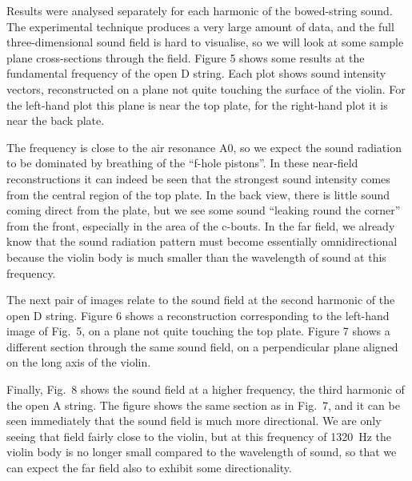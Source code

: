   Results were analysed separately for each harmonic of the bowed-string sound. 
  The experimental technique produces a very large amount of data, and the full 
  three-dimensional sound field is hard to visualise, so we will look at some 
  sample plane cross-sections through the field. Figure 5 shows some results at 
  the fundamental frequency of the open D string. Each plot shows sound 
  intensity vectors, reconstructed on a plane not quite touching the surface of 
  the violin. For the left-hand plot this plane is near the top plate, for the 
  right-hand plot it is near the back plate. 

  The frequency is close to the air resonance A0, so we expect the sound 
  radiation to be dominated by breathing of the “f-hole pistons”. In these 
  near-field reconstructions it can indeed be seen that the strongest sound 
  intensity comes from the central region of the top plate. In the back view, 
  there is little sound coming direct from the plate, but we see some sound 
  “leaking round the corner” from the front, especially in the area of the 
  c-bouts. In the far field, we already know that the sound radiation pattern 
  must become essentially omnidirectional because the violin body is much 
  smaller than the wavelength of sound at this frequency. 

  The next pair of images relate to the sound field at the second harmonic of 
  the open D string. Figure 6 shows a reconstruction corresponding to the 
  left-hand image of Fig.\ 5, on a plane not quite touching the top plate. 
  Figure 7 shows a different section through the same sound field, on a 
  perpendicular plane aligned on the long axis of the violin. 



  Finally, Fig.\ 8 shows the sound field at a higher frequency, the third 
  harmonic of the open A string. The figure shows the same section as in Fig.\ 
  7, and it can be seen immediately that the sound field is much more 
  directional. We are only seeing that field fairly close to the violin, but at 
  this frequency of 1320~Hz the violin body is no longer small compared to the 
  wavelength of sound, so that we can expect the far field also to exhibit some 
  directionality. 

